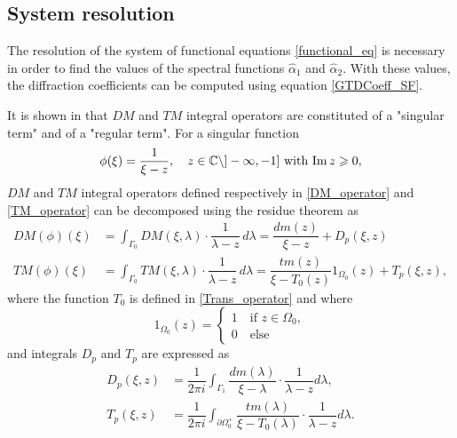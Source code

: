 \subsection{System resolution}
\label{Chapter5:System_resolution}

The resolution of the system of functional equations \eqref{functional_eq} is necessary in order to find the values of the spectral functions $\hat{\alpha}_1 $ and $\hat{\alpha}_2 $. With these values, the diffraction coefficients can be computed using equation \eqref{GTDCoeff_SF}. 

It is shown in \cite{CroisilleLebeau} that $DM$ and $TM$ integral operators are constituted of a "singular term" and of a "regular term". For a singular function 
\begin{equation}
\label{Chapter5:arbitrary_function}
\phi(\xi) = \dfrac{1}{\xi - z},  \quad z \in \mathbb{C}\setminus ]-\infty,-1] \text{ with } {\rm Im} \, z \geqslant 0,
\end{equation}
$DM$ and $TM$ integral operators defined respectively in \eqref{DM_operator} and \eqref{TM_operator} can be decomposed using the residue theorem as
\begin{subequations}
\label{Int_op_decomp}
\begin{align}
\label{Int_op_decomp_DM}
DM(\phi)(\xi) &= \int_{\Gamma_0} DM(\xi,\lambda) \cdot \dfrac{1}{\lambda - z} \, d \lambda = \dfrac{dm(z)}{\xi - z}  + D_p(\xi,z) \\
\label{Int_op_decomp_TM}
TM(\phi)(\xi) &= \int_{\Gamma_0} TM(\xi,\lambda) \cdot \dfrac{1}{\lambda - z} \, d \lambda = \dfrac{tm(z) }{\xi - T_0(z)} 1_{\Omega_0}(z) + T_p(\xi,z),
\end{align}
\end{subequations}
where the function $T_0$ is defined in \eqref{Trans_operator} and where
\begin{equation}
1_{\Omega_0}(z) = 
\begin{cases}
1 \quad \text{if } z  \in \Omega_0, \\
0 \quad \text{else}
\end{cases}
\end{equation}
and integrals $D_p$ and $T_p$ are expressed as
\begin{subequations}
\label{holomorphic_functions}
\begin{align}
\label{defDp}
D_p(\xi,z) &= \dfrac{1}{2\pi i}\int_{\Gamma_1} \dfrac{dm(\lambda)}{\xi-\lambda} \cdot \dfrac{1}{\lambda - z} d\lambda, \\
\label{defTp}
T_p(\xi,z) &= \dfrac{1}{2\pi i}\int_{\partial \Omega_0^+}  \dfrac{tm(\lambda)}{\xi-T_0(\lambda)} \cdot \dfrac{1}{\lambda - z} d\lambda.
\end{align}
\end{subequations}
